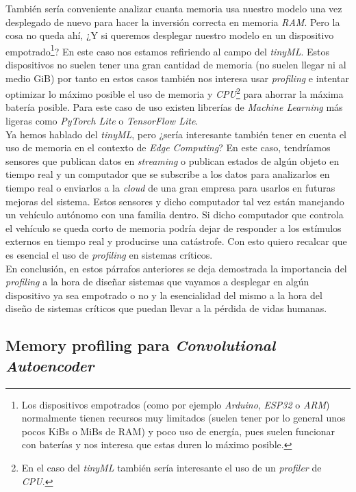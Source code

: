También sería conveniente analizar cuanta memoria usa nuestro modelo una vez desplegado de nuevo para hacer la inversión correcta en memoria \textit{RAM}. Pero la cosa no queda ahí, ¿Y si queremos desplegar nuestro modelo en un dispositivo empotrado\footnote{Los dispositivos empotrados (como por ejemplo \textit{Arduino}, \textit{ESP32} o \textit{ARM}) normalmente tienen recursos muy limitados (suelen tener por lo general unos pocos KiBs o MiBs de RAM) y poco uso de energía, pues suelen funcionar con baterías y nos interesa que estas duren lo máximo posible.}? En este caso nos estamos refiriendo al campo del \textit{tinyML}. Estos dispositivos no suelen tener una gran cantidad de memoria (no suelen llegar ni al medio GiB) por tanto en estos casos también nos interesa usar \textit{profiling} e intentar optimizar lo máximo posible el uso de memoria y \textit{CPU}\footnote{En el caso del \textit{tinyML} también sería interesante el uso de un \textit{profiler} de \textit{CPU}.} para ahorrar la máxima batería posible. Para este caso de uso existen librerías de \textit{Machine Learning} más ligeras como \textit{PyTorch Lite} o \textit{TensorFlow Lite}.\\

Ya hemos hablado del \textit{tinyML}, pero ¿sería interesante también tener en cuenta el uso de memoria en el contexto de \textit{Edge Computing}? En este caso, tendríamos sensores que publican datos en \textit{streaming} o publican estados de algún objeto en tiempo real y un computador que se subscribe a los datos para analizarlos en tiempo real o enviarlos a la \textit{cloud} de una gran empresa para usarlos en futuras mejoras del sistema. Estos sensores y dicho computador tal vez están manejando un vehículo autónomo con una familia dentro. Si dicho computador que controla el vehículo se queda corto de memoria podría dejar de responder a los estímulos externos en tiempo real y producirse una catástrofe. Con esto quiero recalcar que es esencial el uso de \textit{profiling} en sistemas críticos.\\

En conclusión, en estos párrafos anteriores se deja demostrada la importancia del \textit{profiling} a la hora de diseñar sistemas que vayamos a desplegar en algún dispositivo ya sea empotrado o no y la esencialidad del mismo a la hora del diseño de sistemas críticos que puedan llevar a la pérdida de vidas humanas.\\

\subsection{Memory profiling para \textit{Convolutional Autoencoder}}

